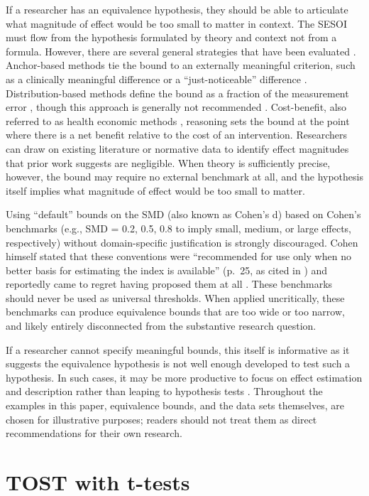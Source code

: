 \documentclass[]{interact}
\theoremstyle{plain}%
\theoremstyle{definition}
\theoremstyle{remark}
\begin{document}
If a researcher has an equivalence hypothesis, they should be able to
articulate what magnitude of effect would be too small to matter in
context. The SESOI must flow from the hypothesis formulated by theory
and context not from a formula. However, there are several general
strategies that have been evaluated \citep{delta2}. Anchor-based methods
tie the bound to an externally meaningful criterion, such as a
clinically meaningful difference or a ``just-noticeable'' difference
\citep{sesoi}. Distribution-based methods define the bound as a fraction
of the measurement error \citep{Jacobson_Truax_1991}, though this
approach is generally not recommended \citep{delta2}. Cost-benefit, also
referred to as health economic methods \citep{delta2}, reasoning sets
the bound at the point where there is a net benefit relative to the cost
of an intervention. Researchers can draw on existing literature or
normative data to identify effect magnitudes that prior work suggests
are negligible. When theory is sufficiently precise, however, the bound
may require no external benchmark at all, and the hypothesis itself
implies what magnitude of effect would be too small to matter.

Using ``default'' bounds on the SMD (also known as Cohen's d) based on
Cohen's benchmarks (e.g., SMD = 0.2, 0.5, 0.8 to imply small, medium, or
large effects, respectively) without domain-specific justification is
strongly discouraged. Cohen himself stated that these conventions were
``recommended for use only when no better basis for estimating the index
is available'' (p.~25, as cited in \citet{panzarella2021}) and
reportedly came to regret having proposed them at all
\citep{funder2019}. These benchmarks should never be used as universal
thresholds. When applied uncritically, these benchmarks can produce
equivalence bounds that are too wide or too narrow, and likely entirely
disconnected from the substantive research question.

If a researcher cannot specify meaningful bounds, this itself is
informative as it suggests the equivalence hypothesis is not well enough
developed to test such a hypothesis. In such cases, it may be more
productive to focus on effect estimation and description rather than
leaping to hypothesis tests \citep{scheel_hypothesis}. Throughout the
examples in this paper, equivalence bounds, and the data sets
themselves, are chosen for illustrative purposes; readers should not
treat them as direct recommendations for their own research.

\section{TOST with t-tests}\label{tost-with-t-tests}
\end{document}
